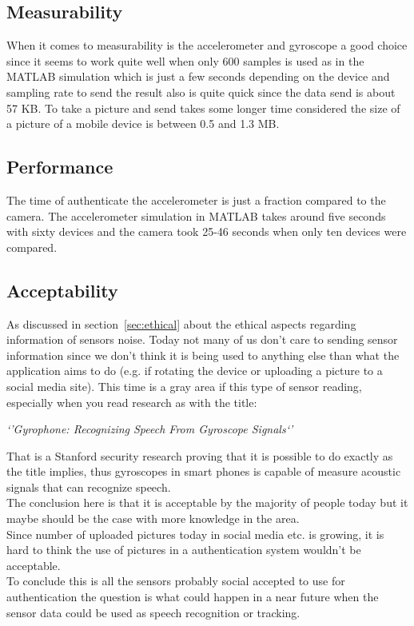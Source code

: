 \subsection*{Measurability}
When it comes to measurability is the accelerometer and gyroscope a good choice since it seems to work quite well when only 600 samples is used as in the MATLAB simulation which is just a few seconds depending on the device and sampling rate to send the result also is quite quick since the data send is about 57 KB. To take a picture and send takes some longer time considered the size of a picture of a mobile device is between 0.5 and 1.3 MB. 

\subsection*{Performance}
The time of authenticate the accelerometer is just a fraction compared to the camera. The accelerometer simulation in MATLAB takes around five seconds with sixty devices and the camera took 25-46 seconds when only ten devices were compared.

\subsection*{Acceptability}
As discussed in section~\ref{sec:ethical} about the ethical aspects regarding information of sensors noise. Today not many of us don't care to sending sensor information since we don't think it is being used to anything else than what the application aims to do (e.g. if rotating the device or uploading a picture to a social media site). This time is a gray area if this type of sensor reading, especially when you read research as with the title:
\begin{center}
\textit{`'Gyrophone: Recognizing Speech From Gyroscope Signals`'}
\end{center}
That is a Stanford security research proving that it is possible to do exactly as the title implies, thus gyroscopes in smart phones is capable of measure acoustic signals that can recognize speech.~\cite[]{stanGyro}\\
The conclusion here is that it is acceptable by the majority of people today but it maybe should be the case with more knowledge in the area.\\Since number of uploaded pictures today in social media etc. is growing, it is hard to think the use of pictures in a authentication system wouldn't be acceptable. \\
To conclude this is all the sensors probably social accepted to use for authentication the question is what could happen in a near future when the sensor data could be used as speech recognition or tracking.

